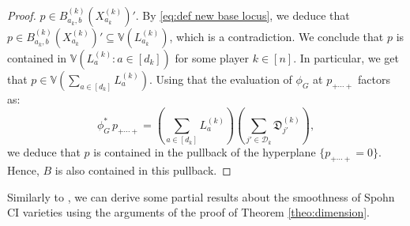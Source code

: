 \documentclass[11pt]{amsart}
\numberwithin{equation}{section}
\theoremstyle{plain}
\numberwithin{theorem}{section}
\theoremstyle{definition}
\begin{document}
\begin{proof}
$p\in B_{a_k,b}^{(k)}(X_{a_k}^{(k)})'$. By \eqref{eq:def new base locus}, we deduce that $p\in B_{a_k,b}^{(k)}(X_{a_k}^{(k)})'\subseteq \mathbb{V}(L_{a_k}^{(k)})$, which is a contradiction. We conclude that $p$ is contained in $\mathbb{V}(L_a^{(k)}: a\in [d_k])$ for some player $k\in [n]$. 
In particular, we get that $p\in \mathbb{V}(
\sum_{a\in [d_k]}L_a^{(k)} )$. Using that the evaluation of $\phi_G$ at $p_{+\cdots+}$ factors as:
\[
\phi_G^{*}\,p_{+\cdots+} = \left( \sum_{a\in [d_k]}L_a^{(k)}\right)\left(
\sum_{j'\in\mathscr D_k}\mathfrak D_{j'}^{(k)}\right),
\]
we deduce that $p$ is contained in the pullback of the hyperplane $\{p_{+\cdots+}=0\}$. Hence, $B$ is also contained in this pullback.
\end{proof}


\noindent Similarly to \cite[Section 3]{portakal2024game}, we can derive some partial results about the smoothness of Spohn CI varieties using the arguments of the proof of Theorem \ref{theo:dimension}. 
\end{document}
